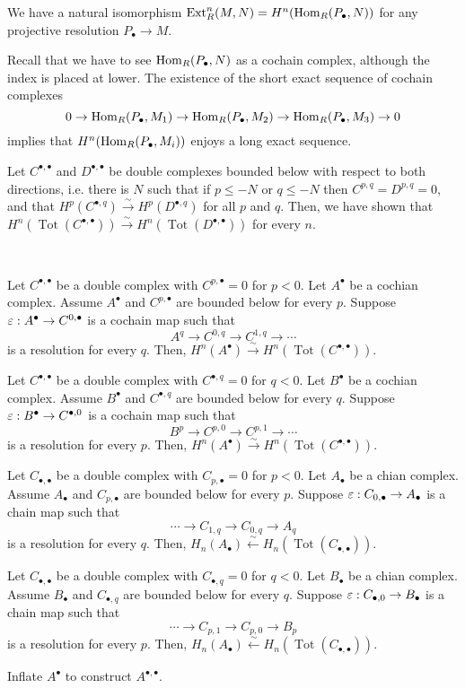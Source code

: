 \documentclass{../../../small}
\DeclareMathOperator{\Tot}{Tot}
\begin{document}
\begin{thm*}[2.4.5]
We have a natural isomorphism $\operatorname{Ext}_R^n(M,N)=H^n(\operatorname{Hom}_R(P_\bullet,N))$ for any projective resolution $P_\bullet\to M$.
\end{thm*}

Recall that we have to see $\operatorname{Hom}_R(P_\bullet,N)$ as a cochain complex, although the index is placed at lower.
The existence of the short exact sequence of cochain complexes
\[0\to\operatorname{Hom}_R(P_\bullet,M_1)\to\operatorname{Hom}_R(P_\bullet,M_2)\to\operatorname{Hom}_R(P_\bullet,M_3)\to0\]
implies that $H^n(\operatorname{Hom}_R(P_\bullet,M_i))$ enjoys a long exact sequence.

Let $C^{\bullet,\bullet}$ and $D^{\bullet,\bullet}$ be double complexes bounded below with respect to both directions, i.e. there is $N$ such that if $p\le-N$ or $q\le-N$ then $C^{p,q}=D^{p,q}=0$, and that $H^p(C^{\bullet,q})\xrightarrow{\sim}H^p(D^{\bullet,q})$ for all $p$ and $q$.
Then, we have shown that $H^n(\Tot(C^{\bullet,\bullet}))\xrightarrow{\sim}H^n(\Tot(D^{\bullet,\bullet}))$ for every $n$.

\begin{prop*}\,
\begin{parts}
\item
Let $C^{\bullet,\bullet}$ be a double complex with $C^{p,\bullet}=0$ for $p<0$.
Let $A^\bullet$ be a cochian complex.
Assume $A^\bullet$ and $C^{p,\bullet}$ are bounded below for every $p$.
Suppose $\varepsilon:A^\bullet\to C^{0,\bullet}$ is a cochain map such that
\[A^q\to C^{0,q}\to C^{1,q}\to\cdots\]
is a resolution for every $q$.
Then, $H^n(A^\bullet)\xrightarrow{\sim} H^n(\Tot(C^{\bullet,\bullet}))$.
\item
Let $C^{\bullet,\bullet}$ be a double complex with $C^{\bullet,q}=0$ for $q<0$.
Let $B^\bullet$ be a cochian complex.
Assume $B^\bullet$ and $C^{\bullet,q}$ are bounded below for every $q$.
Suppose $\varepsilon:B^\bullet\to C^{\bullet,0}$ is a cochain map such that
\[B^p\to C^{p,0}\to C^{p,1}\to\cdots\]
is a resolution for every $p$.
Then, $H^n(A^\bullet)\xrightarrow{\sim} H^n(\Tot(C^{\bullet,\bullet}))$.
\item
Let $C_{\bullet,\bullet}$ be a double complex with $C_{p,\bullet}=0$ for $p<0$.
Let $A_\bullet$ be a chian complex.
Assume $A_\bullet$ and $C_{p,\bullet}$ are bounded below for every $p$.
Suppose $\varepsilon:C_{0,\bullet}\to A_\bullet$ is a chain map such that
\[\cdots\to C_{1,q}\to C_{0,q}\to A_q\]
is a resolution for every $q$.
Then, $H_n(A_\bullet)\xleftarrow{\sim} H_n(\Tot(C_{\bullet,\bullet}))$.
\item
Let $C_{\bullet,\bullet}$ be a double complex with $C_{\bullet,q}=0$ for $q<0$.
Let $B_\bullet$ be a chian complex.
Assume $B_\bullet$ and $C_{\bullet,q}$ are bounded below for every $q$.
Suppose $\varepsilon:C_{\bullet,0}\to B_\bullet$ is a chain map such that
\[\cdots\to C_{p,1}\to C_{p,0}\to B_p\]
is a resolution for every $p$.
Then, $H_n(A_\bullet)\xleftarrow{\sim} H_n(\Tot(C_{\bullet,\bullet}))$.
\end{parts}
\end{prop*}
\begin{pf}
Inflate $A^\bullet$ to construct $A^{\bullet,\bullet}$.
\end{pf}
\end{document}
